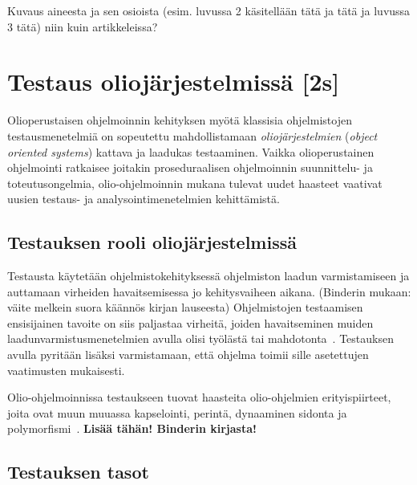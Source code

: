 \documentclass[finnish, grading]{tktltiki2}
\theoremstyle{definition}
\theoremstyle{remark}
\begin{document}
%

Kuvaus aineesta ja sen osioista (esim. luvussa 2 käsitellään tätä ja tätä ja luvussa 3 tätä) niin kuin artikkeleissa?


\section{Testaus oliojärjestelmissä [2s]}

Olioperustaisen ohjelmoinnin kehityksen myötä klassisia ohjelmistojen testausmenetelmiä on sopeutettu mahdollistamaan \textit{oliojärjestelmien} (\textit{object oriented systems}) kattava ja laadukas testaaminen. Vaikka olioperustainen ohjelmointi ratkaisee joitakin proseduraalisen ohjelmoinnin suunnittelu- ja toteutusongelmia, olio-ohjelmoinnin mukana tulevat uudet haasteet vaativat uusien testaus- ja analysointimenetelmien kehittämistä. 

\subsection{Testauksen rooli oliojärjestelmissä}

Testausta käytetään ohjelmistokehityksessä ohjelmiston laadun varmistamiseen ja auttamaan virheiden havaitsemisessa jo kehitysvaiheen aikana. (Binderin mukaan: väite melkein suora käännös kirjan lauseesta) Ohjelmistojen testaamisen ensisijainen tavoite on siis paljastaa virheitä, joiden havaitseminen muiden laadunvarmistusmenetelmien avulla olisi työlästä tai mahdotonta~\cite[s. 59]{Binder:1999}. Testauksen avulla pyritään lisäksi varmistamaan, että ohjelma toimii sille asetettujen vaatimusten mukaisesti. 

Olio-ohjelmoinnissa testaukseen tuovat haasteita olio-ohjelmien erityispiirteet, joita ovat muun muuassa kapselointi, perintä, dynaaminen sidonta ja polymorfismi~\cite[s. 86]{Mariani:Pezze:2008}. \textbf{Lisää tähän! Binderin kirjasta!}


\subsection{Testauksen tasot}
\end{document}
